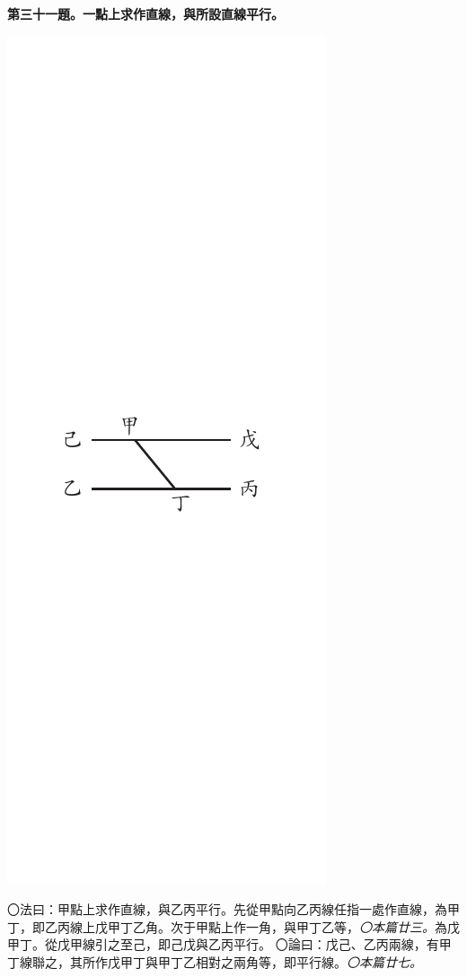 \documentclass[12pt,b5paper,landscape]{article}
\newcommand{\ccom}[1]{{\footnotesize \emph{〇#1}}}
\newcommand{\bcom}[1]{〇#1}
\newcommand{\cthm}[1]{{
\vspace{8pt}

\bfseries #1}}
\begin{document}
\begin{multicols}{2}
\cthm{第三十一題。一點上求作直線，與所設直線平行。}
\begin{center}
      \includegraphics[angle=90]{eu77}
\end{center}
\bcom{法曰：甲點上求作直線，與乙丙平行。先從甲點向乙丙線任指一處作直線，為甲丁，即乙丙線上戊甲丁乙角。次于甲點上作一角，與甲丁乙等，\ccom{本篇廿三。}為戊甲丁。從戊甲線引之至己，即己戊與乙丙平行。}
\bcom{論曰：戊己、乙丙兩線，有甲丁線聯之，其所作戊甲丁與甲丁乙相對之兩角等，即平行線。\ccom{本篇廿七。}}


\end{multicols}
\end{document}
